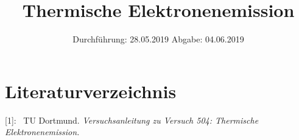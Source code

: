 

\subject{Nr.504}
\title{Thermische Elektronenemission}
\date{
  Durchführung: 28.05.2019
  \hspace{3em}
  Abgabe: 04.06.2019
}



\maketitle
\thispagestyle{empty}
\tableofcontents
\newpage






\section{Literaturverzeichnis}

[1]: \ TU Dortmund. \textit{Versuchsanleitung zu Versuch 504:
Thermische Elektronenemission.}\newline


\printbibliography{}


